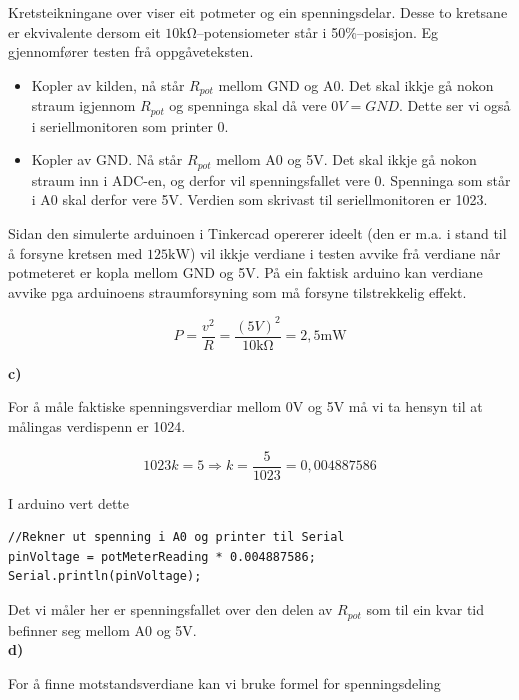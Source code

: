 \documentclass[12pt,a4paper]{article}
\begin{document}
  Kretsteikningane over viser eit potmeter og ein spenningsdelar. Desse to kretsane
  er ekvivalente dersom eit $10\si{\kilo\ohm}$--potensiometer står i 50$\%$--posisjon.
  Eg gjennomfører testen frå oppgåveteksten.

  \begin{itemize}
    \item Kopler av kilden, nå står $R_{pot}$ mellom GND og A0. Det skal ikkje
      gå nokon straum igjennom $R_{pot}$ og spenninga skal då vere $0V = GND$. Dette
      ser vi også i seriellmonitoren som printer 0.
    \item Kopler av GND. Nå står $R_{pot}$ mellom A0 og 5V. Det skal ikkje gå nokon
      straum inn i ADC-en, og derfor vil spenningsfallet vere 0. Spenninga som står
      i A0 skal derfor vere 5V. Verdien som skrivast til seriellmonitoren er 1023.
  \end{itemize}

  Sidan den simulerte arduinoen i Tinkercad opererer ideelt (den er m.a. i stand til å
  forsyne kretsen med $125 \si{\kilo\watt}$) vil ikkje verdiane i testen avvike frå
  verdiane når potmeteret er kopla mellom GND og 5V. På ein faktisk arduino kan verdiane
  avvike pga arduinoens straumforsyning som må forsyne tilstrekkelig effekt.

  \begin{equation}
    P=\frac{v^2}{R}=\frac{(5V)^2}{10\si{\kilo\ohm}} = 2,5\si{\milli\watt}
  \end{equation}

  \textbf{c)}

  For å måle faktiske spenningsverdiar mellom 0V og 5V må vi ta hensyn til at målingas
  verdispenn er 1024.

  \begin{equation}
    1023k=5 \Rightarrow k=\frac{5}{1023}=0,004887586
  \end{equation}

  I arduino vert dette

  \begin{lstlisting}[language=Arduino, basicstyle=\small]
//Rekner ut spenning i A0 og printer til Serial
pinVoltage = potMeterReading * 0.004887586;
Serial.println(pinVoltage);
  \end{lstlisting}
  Det vi måler her er spenningsfallet over den delen av $R_{pot}$ som til ein kvar
  tid befinner seg mellom A0 og 5V. \\


  \textbf{d)}

  For å finne motstandsverdiane kan vi bruke formel for spenningsdeling
\end{document}
